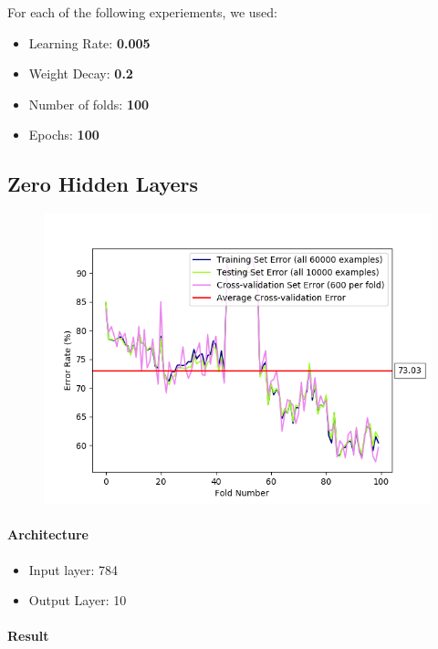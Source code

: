 \documentclass[11pt]{article}
\makeatletter
\def\maxwidth{\ifdim\Gin@nat@width>\linewidth\linewidth
    \else\Gin@nat@width\fi}
\let\Oldincludegraphics\includegraphics
\renewcommand{\includegraphics}[1]{\Oldincludegraphics[width=.8\maxwidth]{#1}}
\providecommand{\tightlist}{%
      \setlength{\itemsep}{0pt}\setlength{\parskip}{0pt}}
\makeatother
\begin{document}
For each of the following experiements, we used:
\begin{itemize}
	\item Learning Rate: \textbf{0.005}
	\item Weight Decay: \textbf{0.2}
	\item Number of folds: \textbf{100}
	\item Epochs: \textbf{100}
\end{itemize}

\subsection{Zero Hidden Layers}\label{zero-hidden-layers}

\begin{figure}[htbp]
\centering
\includegraphics{plots/ff-numlayers-0.png}
\end{figure}

\paragraph{Architecture}\label{architecture}

\begin{itemize}
\tightlist
\item
  Input layer: 784
\item
  Output Layer: 10
\end{itemize}

\paragraph{Result}\label{result}
\end{document}

